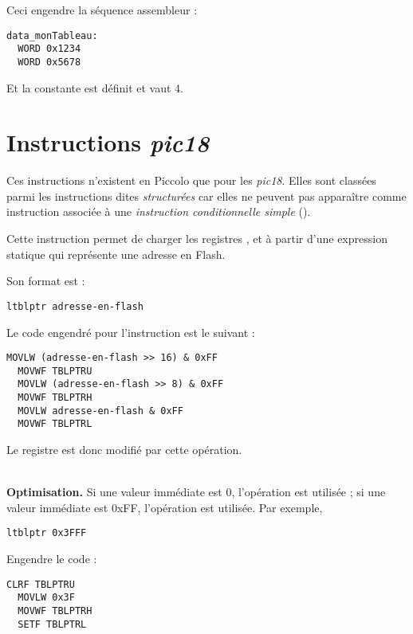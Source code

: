 Ceci engendre la séquence assembleur :

\begin{lstlisting}[language=assembleur]
data_monTableau:
  WORD 0x1234
  WORD 0x5678
\end{lstlisting}

Et la constante  est définit et vaut 4.



\section{Instructions \emph{pic18}}

Ces instructions n'existent en Piccolo que pour les \emph{pic18}. Elles sont classées parmi les instructions dites \emph{structurées} car elles ne peuvent pas apparaître comme instruction associée à une \emph{instruction conditionnelle simple} ().




Cette instruction permet de charger les registres ,  et  à partir d'une expression statique qui représente une adresse en Flash.

Son format est :
\begin{lstlisting}[language=piccolo]
  ltblptr adresse-en-flash
\end{lstlisting}

Le code engendré pour l'instruction est le suivant :
\begin{lstlisting}[language=assembleur]
  MOVLW (adresse-en-flash >> 16) & 0xFF
  MOVWF TBLPTRU
  MOVLW (adresse-en-flash >> 8) & 0xFF
  MOVWF TBLPTRH
  MOVLW adresse-en-flash & 0xFF
  MOVWF TBLPTRL
\end{lstlisting}

Le registre  est donc modifié par cette opération.

~\\
\textbf{Optimisation.} Si une valeur immédiate est 0, l'opération  est utilisée ; si une valeur immédiate est 0xFF, l'opération  est utilisée. Par exemple, 
\begin{lstlisting}[language=piccolo]
  ltblptr 0x3FFF
\end{lstlisting}

Engendre le code :
\begin{lstlisting}[language=assembleur]
  CLRF TBLPTRU
  MOVLW 0x3F
  MOVWF TBLPTRH
  SETF TBLPTRL
\end{lstlisting}


